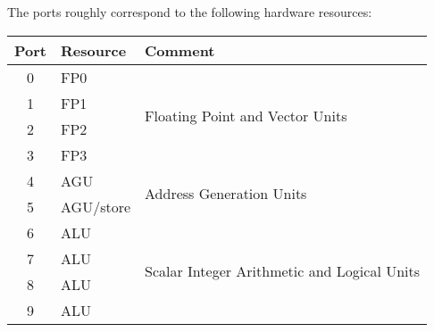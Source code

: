The ports roughly correspond to the following hardware resources:
\begin{center}
    \begin{tabular}{clp{}}
        \toprule
        \textbf{Port} & \textbf{Resource} & \textbf{Comment}\\
        \toprule
        0 & FP0 & \multirow{4}{*}{Floating Point and Vector Units}\\
        1 & FP1 & \\
        2 & FP2 & \\
        3 & FP3 & \\
        4 & AGU & \multirow{2}{*}{Address Generation Units}\\
        5 & AGU/store & \\
        6 & ALU & \multirow{4}{*}{Scalar Integer Arithmetic and Logical Units}\\
        7 & ALU & \\
        8 & ALU & \\
        9 & ALU & \\
        \bottomrule
    \end{tabular}
\end{center}

